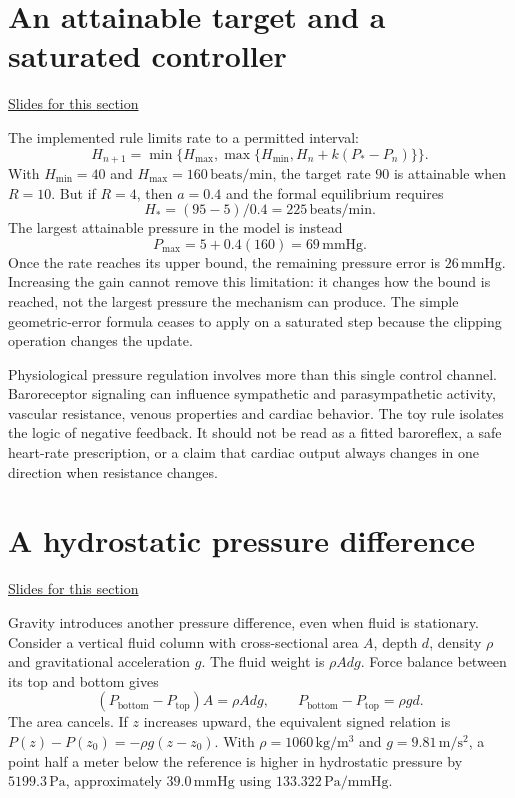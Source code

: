 \documentclass[11pt,letterpaper]{article}
\theoremstyle{definition}\newtheorem{definition}{Definition}\newtheorem{example}{Example}
\numberwithin{equation}{section}
\begin{document}
\section{An attainable target and a saturated controller}
\hypertarget{note-an-attainable-target-and-a-saturated-controller}{}\label{note:an-attainable-target-and-a-saturated-controller}
{\small \href{slides.html\#frame=the-rate-cannot-increase-without-bound\&step=1}{Slides for this section}}\par
The implemented rule limits rate to a permitted interval:
\begin{equation}H_{n+1}=\min\{H_{\max},\max\{H_{\min},H_n+k(P_*-P_n)\}\}.\end{equation}
With $H_{\min}=40$ and $H_{\max}=160\,\mathrm{beats/min}$, the target rate $90$ is attainable when $R=10$. But if $R=4$, then $a=0.4$ and the formal equilibrium requires
\[H_*=(95-5)/0.4=225\,\mathrm{beats/min}.
\]
The largest attainable pressure in the model is instead
\[P_{\max}=5+0.4(160)=69\,\mathrm{mmHg}.
\]
Once the rate reaches its upper bound, the remaining pressure error is $26\,\mathrm{mmHg}$. Increasing the gain cannot remove this limitation: it changes how the bound is reached, not the largest pressure the mechanism can produce. The simple geometric-error formula ceases to apply on a saturated step because the clipping operation changes the update.

Physiological pressure regulation involves more than this single control channel. Baroreceptor signaling can influence sympathetic and parasympathetic activity, vascular resistance, venous properties and cardiac behavior. The toy rule isolates the logic of negative feedback. It should not be read as a fitted baroreflex, a safe heart-rate prescription, or a claim that cardiac output always changes in one direction when resistance changes.
\section{A hydrostatic pressure difference}
\hypertarget{note-a-hydrostatic-pressure-difference}{}\label{note:a-hydrostatic-pressure-difference}
{\small \href{slides.html\#frame=the-weight-of-a-static-column\&step=1}{Slides for this section}}\par
Gravity introduces another pressure difference, even when fluid is stationary. Consider a vertical fluid column with cross-sectional area $A$, depth $d$, density $\rho$ and gravitational acceleration $g$. The fluid weight is $\rho Adg$. Force balance between its top and bottom gives
\begin{equation}(P_{\mathrm{bottom}}-P_{\mathrm{top}})A=\rho Adg,
\qquad P_{\mathrm{bottom}}-P_{\mathrm{top}}=\rho gd.\end{equation}
The area cancels. If $z$ increases upward, the equivalent signed relation is $P(z)-P(z_0)=-\rho g(z-z_0)$. With $\rho=1060\,\mathrm{kg/m^3}$ and $g=9.81\,\mathrm{m/s^2}$, a point half a meter below the reference is higher in hydrostatic pressure by $5199.3\,\mathrm{Pa}$, approximately $39.0\,\mathrm{mmHg}$ using $133.322\,\mathrm{Pa/mmHg}$.
\end{document}

